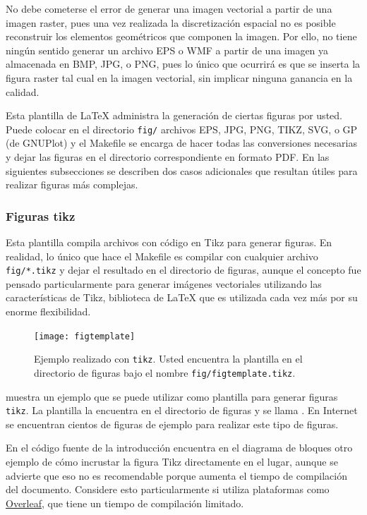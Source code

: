 No debe cometerse el error de generar una imagen vectorial a partir de una
imagen raster, pues una vez realizada la discretización espacial no es posible
reconstruir los elementos geométricos que componen la imagen. Por ello, no
tiene ningún sentido generar un archivo EPS o WMF a partir de una imagen ya
almacenada en BMP, JPG, o PNG, pues lo único que ocurrirá es que se inserta la
figura raster tal cual en la imagen vectorial, sin implicar ninguna ganancia en
la calidad.

Esta plantilla de LaTeX administra la generación de ciertas figuras
por usted.  Puede colocar en el directorio \texttt{fig/} archivos EPS,
JPG, PNG, TIKZ, SVG, o GP (de GNUPlot) y el Makefile se encarga de
hacer todas las conversiones necesarias y dejar las figuras en el
directorio correspondiente en formato PDF.  En las siguientes
subsecciones se describen dos casos adicionales que resultan útiles
para realizar figuras más complejas.

\subsubsection{Figuras tikz}

Esta plantilla compila archivos con código en Tikz para generar
figuras.
%
En realidad, lo único que hace el Makefile es compilar con
 cualquier archivo \texttt{fig/*.tikz} y dejar el
resultado en el directorio de figuras, aunque el concepto fue pensado
particularmente para generar imágenes vectoriales utilizando las
características de Tikz, biblioteca de LaTeX que es utilizada cada vez
más por su enorme flexibilidad.
%
\begin{figure}[htb]
  \centering
  \texttt{[image: figtemplate]}
  \caption[Ejemplo de figura con tikz]{Ejemplo realizado con
    \texttt{tikz}.  Usted encuentra la plantilla en el directorio de
    figuras bajo el nombre \texttt{fig/figtemplate.tikz}.}
  \label{fig:figtemplate}
\end{figure}

 muestra un ejemplo que se puede utilizar como
plantilla para generar figuras \texttt{tikz}.  La plantilla la
encuentra en el directorio de figuras y se llama
.  En Internet se encuentran cientos de figuras
de ejemplo para realizar este tipo de figuras.

En el código fuente de la introducción  encuentra en
el diagrama de bloques otro ejemplo de cómo incrustar la figura Tikz
directamente en el lugar, aunque se advierte que eso no es
recomendable porque aumenta el tiempo de compilación del documento.
Considere esto particularmente si utiliza plataformas como
\href{https://overleaf.com}{Overleaf}, que tiene un tiempo de
compilación limitado.


